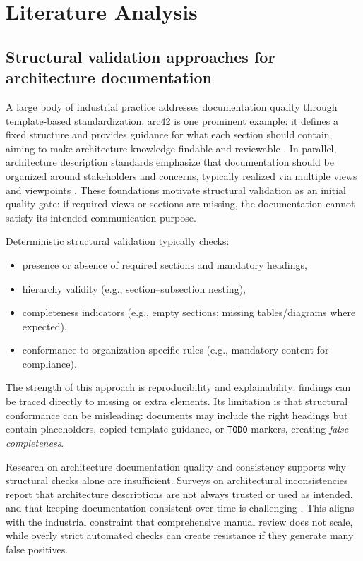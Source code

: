 \section{Literature Analysis}

\subsection{Structural validation approaches for architecture documentation}
A large body of industrial practice addresses documentation quality through template-based standardization. arc42 is one prominent example: it defines a fixed structure and provides guidance for what each section should contain, aiming to make architecture knowledge findable and reviewable \cite{arc42_template}. In parallel, architecture description standards emphasize that documentation should be organized around stakeholders and concerns, typically realized via multiple views and viewpoints \cite{iso42010}. These foundations motivate structural validation as an initial quality gate: if required views or sections are missing, the documentation cannot satisfy its intended communication purpose.

Deterministic structural validation typically checks:
\begin{itemize}
    \item presence or absence of required sections and mandatory headings,
    \item hierarchy validity (e.g., section--subsection nesting),
    \item completeness indicators (e.g., empty sections; missing tables/diagrams where expected),
    \item conformance to organization-specific rules (e.g., mandatory content for compliance).
\end{itemize}

The strength of this approach is reproducibility and explainability: findings can be traced directly to missing or extra elements. Its limitation is that structural conformance can be misleading: documents may include the right headings but contain placeholders, copied template guidance, or \texttt{TODO} markers, creating \emph{false completeness}.

Research on architecture documentation quality and consistency supports why structural checks alone are insufficient. Surveys on architectural inconsistencies report that architecture descriptions are not always trusted or used as intended, and that keeping documentation consistent over time is challenging \cite{wohlrab_icsa19_guidelines}. This aligns with the industrial constraint that comprehensive manual review does not scale, while overly strict automated checks can create resistance if they generate many false positives.


